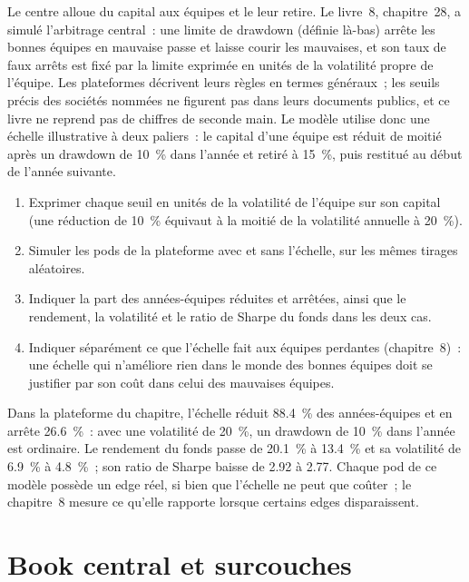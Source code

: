 Le centre alloue du capital aux équipes et le leur retire. Le livre~8, chapitre~28, a simulé l'arbitrage central~: une limite de drawdown
(définie là-bas) arrête les bonnes équipes en mauvaise passe et laisse courir les mauvaises, et son taux de faux arrêts est fixé par la limite exprimée en unités de la volatilité propre
de l'équipe. Les plateformes décrivent leurs règles en termes généraux~; les seuils précis des sociétés nommées ne figurent pas dans leurs documents publics, et ce
livre ne reprend pas de chiffres de seconde main. Le modèle utilise donc une échelle illustrative à deux paliers~: le capital d'une équipe est réduit de moitié après un drawdown de 10~\%
dans l'année et retiré à 15~\%, puis restitué au début de l'année suivante.

\begin{method}\label{met:fm:the-multi-manager-platform:ladder}
\begin{enumerate}
\item Exprimer chaque seuil en unités de la volatilité de l'équipe sur son capital (une réduction de 10~\% équivaut à la moitié de la volatilité annuelle à 20~\%).
\item Simuler les pods de la plateforme avec et sans l'échelle, sur les mêmes tirages aléatoires.
\item Indiquer la part des années-équipes réduites et arrêtées, ainsi que le rendement, la volatilité et le ratio de Sharpe du fonds dans les deux cas.
\item Indiquer séparément ce que l'échelle fait aux équipes perdantes (chapitre~8)~: une échelle qui n'améliore rien dans le monde des bonnes équipes doit se justifier par son coût
dans celui des mauvaises équipes.
\end{enumerate}
\end{method}

Dans la plateforme du chapitre, l'échelle réduit 88.4~\% des années-équipes et en arrête 26.6~\%~: avec une volatilité de 20~\%, un drawdown de 10~\% dans l'année est
ordinaire. Le rendement du fonds passe de 20.1~\% à 13.4~\% et sa volatilité de 6.9~\% à 4.8~\%~; son ratio de Sharpe baisse de 2.92 à 2.77. Chaque
pod de ce modèle possède un edge réel, si bien que l'échelle ne peut que coûter~; le chapitre~8 mesure ce qu'elle rapporte lorsque certains edges disparaissent.

\section{Book central et surcouches}


